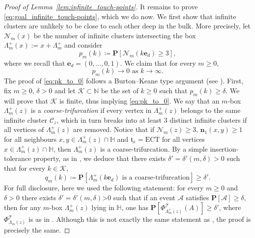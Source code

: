 \documentclass[11pt,a4paper]{article}
\theoremstyle{definition}
\numberwithin{equation}{section}
\newcommand\n{\mathbf{n}}
\newcommand\ft{\mathfrak{t}}
\begin{document}
\begin{proof}[Proof of Lemma~\textup{\ref{lem:infinite_touch-points}}]
It remains to prove \eqref{eq:goal_infinite_touch-points}, which we do now. We first show that infinite clusters are unlikely to be close to each other deep in the bulk. More precisely, let $\mathcal{N}_m(x)$ be the number of infinite clusters intersecting the box  $\Lambda^+_m(x):=x+\Lambda_m^+$ and consider
$$p_m(k)\coloneqq \mathbf{P} [\mathcal{N}_m(k\mathbf{e}_d)\geq 3],$$
where we recall that $\mathbf{e}_d=(0,\dots,0,1)$. We claim that for every $m\geq0$,
\begin{equation}\label{eq:pk_to_0}
    p_m(k)\longrightarrow 0 \text{ as } k\to\infty.
\end{equation}
The proof of \eqref{eq:pk_to_0} follows a Burton--Keane type argument (see \cite{BurtonKeane1989density}). First, fix $m\geq0$, $\delta>0$ and let $\mathcal{K}\subset \mathbb{N}$ be the set of $k\geq0$ such that $p_m(k)\geq \delta$. We will prove that $\mathcal{K}$ is finite, thus implying \eqref{eq:pk_to_0}. 
We say that an $m$-box $\Lambda^+_m(z)$ is a \emph{coarse-trifurcation} if every vertex in $\Lambda^+_m(z)$ belongs to the same infinite cluster $\mathcal{C}_z$, which in turn breaks into at least $3$ distinct infinite clusters if all vertices of $\Lambda^+_m(z)$ are removed. 
Notice that if $\mathcal{N}_m(z)\geq 3$, $\n_1(x,y)\geq1$ for all neighbours $x,y\in \Lambda^+_m(z)\cap \mathbb{H}$ and $\ft_x=\mathrm{ECT}$ for all vertices $x\in \Lambda^+_m(z)\cap \mathbb{H}$, then $\Lambda^+_m(z)$ is a coarse-trifurcation.
By a simple insertion-tolerance property, as in \cite[Proposition~5.12]{GunaratnamPanagiotisPanisSeveroPhi42022},
we deduce that there exists $\delta'=\delta'(m,\delta)>0$ such that for every $k\in \mathcal K$,
\begin{equation}\label{eq:qm>delta'}
    q_m(k)\coloneq \mathbf{P}[\Lambda^+_m(k\mathbf{e}_d) \text{ is a coarse-trifurcation}]\geq \delta'.
\end{equation} 
For full disclosure, here we used the following statement: for every $m\geq0$ and $\delta>0$ there exists $\delta'=\delta'(m,\delta)$>0 such that if an event $\mathcal{A}$ satisfies $\mathbf{P}[\mathcal{A}]\geq \delta$, then for any $m$-box $\Lambda^+_m(z)$ lying in $\mathbb H$, one has $\mathbf{P}[\Phi_{\Lambda^+_m(z)}^\mathcal{T}(A)]\geq \delta'$, where $\Phi^\mathcal{T}_{\Lambda_m(z)}$ is as in \cite[Definition~5.11]{GunaratnamPanagiotisPanisSeveroPhi42022}. Although this is not exactly the same statement as \cite[Proposition~5.12]{GunaratnamPanagiotisPanisSeveroPhi42022}, the proof is precisely the same.


\end{proof}
\end{document}
